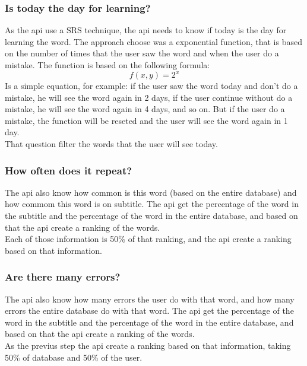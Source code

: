 \documentclass[12pt]{article}
\begin{document}
\subsubsection{Is today the day for learning?}
As the api use a SRS technique, the api needs to know if today is the day for learning the word. The approach choose was a exponential function, that is based on the number of times that the user saw the word and when the user do a mistake. The function is based on the following formula:
\begin{equation}
  \label{eq:1}
  f(x, y) = 2^x 
\end{equation}
Is a simple equation, for example: if the user saw the word today and don't do a mistake, he will see the word again in 2 days, if the user continue without do a mistake, he will see the word again in 4 days, and so on. But if the user do a mistake, the function will be reseted and the user will see the word again in 1 day. \\
That question filter the words that the user will see today. \\
\subsubsection{How often does it repeat?}
The api also know how common is this word (based on the entire database) and how commom this word is on subtitle. The api get the percentage of the word in the subtitle and the percentage of the word in the entire database, and based on that the api create a ranking of the words. \\
Each of those information is 50\% of that ranking, and the api create a ranking based on that information. \\

\subsubsection{Are there many errors?}
The api also know how many errors the user do with that word, and how many errors the entire database do with that word. The api get the percentage of the word in the subtitle and the percentage of the word in the entire database, and based on that the api create a ranking of the words. \\
As the previus step the api create a ranking based on that information, taking 50\% of database and 50\% of the user. \\
\end{document}
